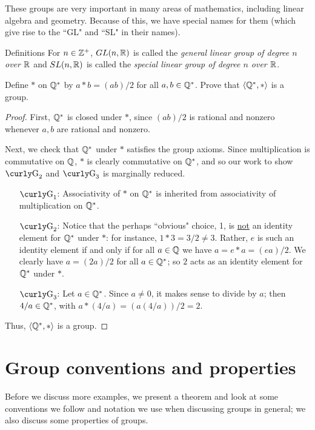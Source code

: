 These groups are very important in many areas of mathematics, including linear algebra and geometry.  Because of this, we have special names for them (which give rise to the ``GL" and ``SL" in their names).

\begin{df}{Definitions} For $n\in \mathbb{Z}^+$, $GL(n,\mathbb{R})$ is called the \textit{general
linear group of degree $n$ over $\mathbb{R}$} and $SL(n,\mathbb{R})$ is
called the \textit{special linear group of degree $n$ over
$\mathbb{R}$}.\end{df}

\begin{example}{} Define $*$ on $\mathbb{Q}^*$ by $a*b=(ab)/2$ for all $a,b\in \mathbb{Q}^*$.  Prove that $\langle\mathbb{Q}^*,*\rangle$ is a group.

\begin{proof} First, $\mathbb{Q}^*$ is closed under $*$, since $(ab)/2$ is
rational and nonzero whenever $a,b$ are rational and nonzero.

Next, we check that $\mathbb{Q}^*$ under $*$ satisfies the group
axioms. Since multiplication is commutative on $\mathbb{Q}$, $*$ is
clearly commutative on $\mathbb{Q}^*$, and so our work to show
$\G_2$ and $\G_3$ is marginally reduced.

\begin{enumerate}
\item[$\G_1$:] Associativity of $*$ on $\mathbb{Q}^*$ is inherited
    from associativity of multiplication on $\mathbb{Q}^*$.
\item[$\G_2$:] Notice that the perhaps ``obvious" choice, 1, is
    \underline{not} an identity element for $\mathbb{Q}^*$ under
    $*$: for instance, $1*3=3/2 \neq 3$. Rather, $e$ is such an
    identity element if and only if for all $a\in \mathbb{Q}$ we
    have $a=e*a=(ea)/2$. We clearly have $a=(2a)/2$ for all
    $a\in \mathbb{Q}^*$; so $2$ acts as an identity element for
    $\mathbb{Q}^*$ under $*$.
\item[$\G_3$:] Let $a\in \mathbb{Q}^*$.  Since $a\neq 0$, it makes
    sense to divide by $a$; then $4/a\in \mathbb{Q}^*$, with
    $a*(4/a)=(a(4/a))/2=2$.
\end{enumerate}
Thus,  $\langle\mathbb{Q}^*,*\rangle$ is a group.\end{proof}
\end{example}

\section{Group conventions and properties}

\noindent Before we discuss more examples, we present a theorem and look at some conventions we follow and notation we use  when discussing groups in general; we also discuss some properties of groups.

